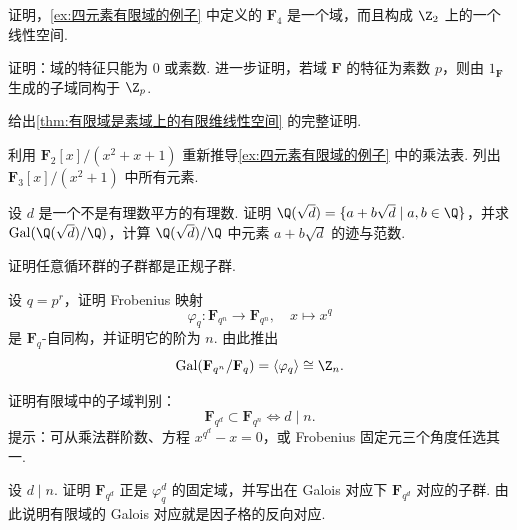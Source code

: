 \begin{exercise}
    \begin{exgroup}
        \item 证明，\autoref{ex:四元素有限域的例子} 中定义的 $\mathbf{F}_4$ 是一个域，而且构成 $\Z_2$ 上的一个线性空间.
        \item 证明：域的特征只能为 $0$ 或素数. 进一步证明，若域 $\mathbf{F}$ 的特征为素数 $p$，则由 $1_\mathbf{F}$ 生成的子域同构于 $\Z_p$.
        \item 给出\autoref{thm:有限域是素域上的有限维线性空间} 的完整证明.
        \item 利用 $\mathbf{F}_2[x]/(x^2+x+1)$ 重新推导\autoref{ex:四元素有限域的例子} 中的乘法表. 列出 $\mathbf{F}_3[x]/(x^2+1)$ 中所有元素.
        \item 设 $d$ 是一个不是有理数平方的有理数. 证明 $\Q(\sqrt{d})=\{a+b\sqrt{d}\mid a,b\in\Q\}$，并求 $\Gal(\Q(\sqrt{d})/\Q)$，计算 $\Q(\sqrt{d})/\Q$ 中元素 $a+b\sqrt{d}$ 的迹与范数.
        \item 证明任意循环群的子群都是正规子群.
    \end{exgroup}

    \begin{exgroup}
        \item 设 $q=p^r$，证明 Frobenius 映射
        \[
            \varphi_q\colon \mathbf{F}_{q^n}\to\mathbf{F}_{q^n},\quad x\mapsto x^q
        \]
        是 $\mathbf{F}_q$-自同构，并证明它的阶为 $n$. 由此推出
        \[
            \Gal(\mathbf{F}_{q^n}/\mathbf{F}_q)=\langle\varphi_q\rangle\cong \Z_n.
        \]
        \item 证明有限域中的子域判别：
        \[
            \mathbf{F}_{q^d}\subset \mathbf{F}_{q^n}\iff d\mid n.
        \]
        提示：可从乘法群阶数、方程 $x^{q^d}-x=0$，或 Frobenius 固定元三个角度任选其一.
        \item 设 $d\mid n$. 证明 $\mathbf{F}_{q^d}$ 正是 $\varphi_q^d$ 的固定域，并写出在 Galois 对应下 $\mathbf{F}_{q^d}$ 对应的子群. 由此说明有限域的 Galois 对应就是因子格的反向对应.
    \end{exgroup}


\end{exercise}
